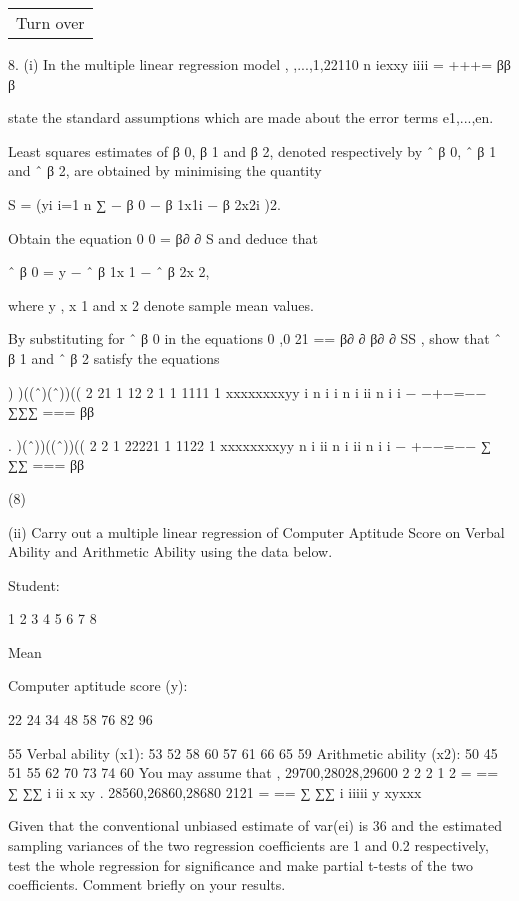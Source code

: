 \documentclass[a4paper,12pt]{article}
\begin{document}
  \begin{table}[ht!]
     \centering
     \begin{tabular}{|p{15cm}|}
     \hline
Turn over 

      \end{tabular}
    \end{table}
8. (i) In the multiple linear regression model 
   , ,...,1,22110 n iexxy iiii = +++= ββ β
 
 state the standard assumptions which are made about the error terms e1,...,en. 
 
 Least squares estimates of 
β 0,
β 1 and 
β 2, denoted respectively by ˆ β 0, ˆ β 1 
and ˆ β 2, are obtained by minimising the quantity 
 
   S = (yi i=1 n ∑ −
β 0 −
β 1x1i −
β 2x2i )2. 
 
  Obtain the equation 0
0
=
β∂ ∂
S
 and deduce that 
 
   ˆ β 0 = y − ˆ β 1x 1 − ˆ β 2x 2, 
 
  where y , x 1 and x 2 denote sample mean values. 
 
 By substituting for ˆ β 0 in the equations 0 ,0 21 == β∂ ∂ β∂ ∂ SS
, show that ˆ β 1 
and ˆ β 2 satisfy the equations 
 
   ) )((ˆ)(ˆ))(( 2 21 1 12 2 1 1 1111 1 xxxxxxxxyy i n i i n i ii n i i − −+−=−− ∑∑∑ === ββ
 
   . )(ˆ))((ˆ))(( 2 2 1 22221 1 1122 1 xxxxxxxxyy n i ii n i ii n i i − +−−=−− ∑ ∑∑ === ββ
 
 
(8) 
 
(ii) Carry out a multiple linear regression of Computer Aptitude Score on Verbal Ability and Arithmetic Ability using the data below.  
 
 
Student: 
 
  1      2      3      4      5      6      7      8 
 
Mean 
 
Computer aptitude score (y): 
 
22    24    34    48    58    76    82    96 
 
55 Verbal ability (x1): 53    52    58    60    57    61    66    65 59 Arithmetic ability (x2): 50    45    51    55    62    70    73    74 60  You may assume that  , 29700,28028,29600 2 2 2 1 2 = == ∑ ∑∑ i ii x xy  . 28560,26860,28680 2121 = == ∑ ∑∑ i iiiii y xyxxx 
 
 Given that the conventional unbiased estimate of var(ei) is 36 and the estimated sampling variances of the two regression coefficients are 1 and 0.2 respectively, test the whole regression for significance and make partial t-tests of the two coefficients.  Comment briefly on your results. 
 
\end{document}
